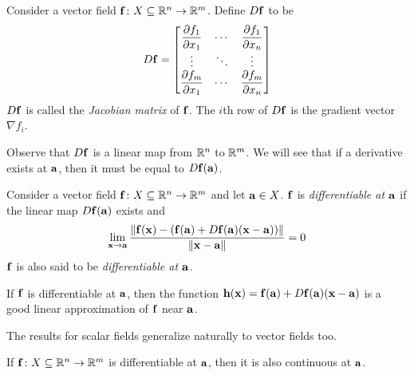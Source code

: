 \documentclass{article}
\begin{document}
\begin{definition}
  Consider a vector field $\mathbf{f} \colon X \subseteq \mathbb{R}^n \to \mathbb{R}^m$.
  Define $D\mathbf{f}$ to be
  \begin{align}
    D\mathbf{f} = \begin{bmatrix}
                  \dfrac{\partial f_1}{\partial x_1} & \cdots & \dfrac{\partial f_1}{\partial x_n}
                  \\
                  \vdots                             & \ddots & \vdots
                  \\
                  \dfrac{\partial f_m}{\partial x_1} & \cdots & \dfrac{\partial f_m}{\partial x_n}
                \end{bmatrix}
  \end{align}
  $D\mathbf{f}$ is called the \emph{Jacobian matrix} of $\mathbf{f}$.
  The $i$th row of $D\mathbf{f}$ is the gradient vector $\nabla f_i$.
\end{definition}
Observe that $D\mathbf{f}$ is a linear map from $\mathbb{R}^n$ to $\mathbb{R}^m$.
We will see that if a derivative exists at $\mathbf{a}$, then it must be equal to $D\mathbf{f}(\mathbf{a})$.

\begin{definition}[Differentiability]
  Consider a vector field $\mathbf{f} \colon X \subseteq \mathbb{R}^n \to \mathbb{R}^m$ and let $\mathbf{a} \in X$.
  $\mathbf{f}$ is \emph{differentiable at $\mathbf{a}$} if the linear map $D\mathbf{f}(\mathbf{a})$ exists and
  \begin{align}
    \lim_{\mathbf{x} \to \mathbf{a}} \frac{\norm{\mathbf{f}(\mathbf{x}) - (\mathbf{f}(\mathbf{a}) + D\mathbf{f}(\mathbf{a})(\mathbf{x} - \mathbf{a}))}}{\norm{\mathbf{x} - \mathbf{a}}} = 0
  \end{align}
  $\mathbf{f}$ is also said to be \emph{differentiable at $\mathbf{a}$}.
\end{definition}
If $\mathbf{f}$ is differentiable at $\mathbf{a}$, then the function $\mathbf{h}(\mathbf{x}) = \mathbf{f}(\mathbf{a}) + D\mathbf{f}(\mathbf{a})(\mathbf{x} - \mathbf{a})$ is a good linear approximation of $\mathbf{f}$ near $\mathbf{a}$.

The results for scalar fields generalize naturally to vector fields too.

\begin{theorem}
  If $\mathbf{f} \colon X \subseteq \mathbb{R}^n \to \mathbb{R}^m$ is differentiable at $\mathbf{a}$, then it is also continuous at $\mathbf{a}$.
\end{theorem}
\end{document}

